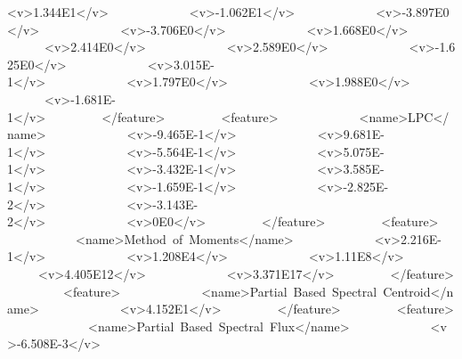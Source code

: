 \documentclass[11pt]{article}
\begin{document}
\textless{}v\textgreater{}1.344E1\textless{}/v\textgreater{}\ \ \ \ \ \ \ \ \ \ \ \ \ \textless{}v\textgreater{}-1.062E1\textless{}/v\textgreater{}\ \ \ \ \ \ \ \ \ \ \ \ \ \textless{}v\textgreater{}-3.897E0\textless{}/v\textgreater{}\ \ \ \ \ \ \ \ \ \ \ \ \ \textless{}v\textgreater{}-3.706E0\textless{}/v\textgreater{}\ \ \ \ \ \ \ \ \ \ \ \ \ \textless{}v\textgreater{}1.668E0\textless{}/v\textgreater{}\ \ \ \ \ \ \ \ \ \ \ \ \ \textless{}v\textgreater{}2.414E0\textless{}/v\textgreater{}\ \ \ \ \ \ \ \ \ \ \ \ \ \textless{}v\textgreater{}2.589E0\textless{}/v\textgreater{}\ \ \ \ \ \ \ \ \ \ \ \ \ \textless{}v\textgreater{}-1.625E0\textless{}/v\textgreater{}\ \ \ \ \ \ \ \ \ \ \ \ \ \textless{}v\textgreater{}3.015E-1\textless{}/v\textgreater{}\ \ \ \ \ \ \ \ \ \ \ \ \ \textless{}v\textgreater{}1.797E0\textless{}/v\textgreater{}\ \ \ \ \ \ \ \ \ \ \ \ \ \textless{}v\textgreater{}1.988E0\textless{}/v\textgreater{}\ \ \ \ \ \ \ \ \ \ \ \ \ \textless{}v\textgreater{}-1.681E-1\textless{}/v\textgreater{}\ \ \ \ \ \ \ \ \ \textless{}/feature\textgreater{}\ \ \ \ \ \ \ \ \ \textless{}feature\textgreater{}\ \ \ \ \ \ \ \ \ \ \ \ \ \textless{}name\textgreater{}LPC\textless{}/name\textgreater{}\ \ \ \ \ \ \ \ \ \ \ \ \ \textless{}v\textgreater{}-9.465E-1\textless{}/v\textgreater{}\ \ \ \ \ \ \ \ \ \ \ \ \ \textless{}v\textgreater{}9.681E-1\textless{}/v\textgreater{}\ \ \ \ \ \ \ \ \ \ \ \ \ \textless{}v\textgreater{}-5.564E-1\textless{}/v\textgreater{}\ \ \ \ \ \ \ \ \ \ \ \ \ \textless{}v\textgreater{}5.075E-1\textless{}/v\textgreater{}\ \ \ \ \ \ \ \ \ \ \ \ \ \textless{}v\textgreater{}-3.432E-1\textless{}/v\textgreater{}\ \ \ \ \ \ \ \ \ \ \ \ \ \textless{}v\textgreater{}3.585E-1\textless{}/v\textgreater{}\ \ \ \ \ \ \ \ \ \ \ \ \ \textless{}v\textgreater{}-1.659E-1\textless{}/v\textgreater{}\ \ \ \ \ \ \ \ \ \ \ \ \ \textless{}v\textgreater{}-2.825E-2\textless{}/v\textgreater{}\ \ \ \ \ \ \ \ \ \ \ \ \ \textless{}v\textgreater{}-3.143E-2\textless{}/v\textgreater{}\ \ \ \ \ \ \ \ \ \ \ \ \ \textless{}v\textgreater{}0E0\textless{}/v\textgreater{}\ \ \ \ \ \ \ \ \ \textless{}/feature\textgreater{}\ \ \ \ \ \ \ \ \ \textless{}feature\textgreater{}\ \ \ \ \ \ \ \ \ \ \ \ \ \textless{}name\textgreater{}Method\ of\ Moments\textless{}/name\textgreater{}\ \ \ \ \ \ \ \ \ \ \ \ \ \textless{}v\textgreater{}2.216E-1\textless{}/v\textgreater{}\ \ \ \ \ \ \ \ \ \ \ \ \ \textless{}v\textgreater{}1.208E4\textless{}/v\textgreater{}\ \ \ \ \ \ \ \ \ \ \ \ \ \textless{}v\textgreater{}1.11E8\textless{}/v\textgreater{}\ \ \ \ \ \ \ \ \ \ \ \ \ \textless{}v\textgreater{}4.405E12\textless{}/v\textgreater{}\ \ \ \ \ \ \ \ \ \ \ \ \ \textless{}v\textgreater{}3.371E17\textless{}/v\textgreater{}\ \ \ \ \ \ \ \ \ \textless{}/feature\textgreater{}\ \ \ \ \ \ \ \ \ \textless{}feature\textgreater{}\ \ \ \ \ \ \ \ \ \ \ \ \ \textless{}name\textgreater{}Partial\ Based\ Spectral\ Centroid\textless{}/name\textgreater{}\ \ \ \ \ \ \ \ \ \ \ \ \ \textless{}v\textgreater{}4.152E1\textless{}/v\textgreater{}\ \ \ \ \ \ \ \ \ \textless{}/feature\textgreater{}\ \ \ \ \ \ \ \ \ \textless{}feature\textgreater{}\ \ \ \ \ \ \ \ \ \ \ \ \ \textless{}name\textgreater{}Partial\ Based\ Spectral\ Flux\textless{}/name\textgreater{}\ \ \ \ \ \ \ \ \ \ \ \ \ \textless{}v\textgreater{}-6.508E-3\textless{}/v\textgreater{}\ \ \ \ \ \ \ \ 
\end{document}
